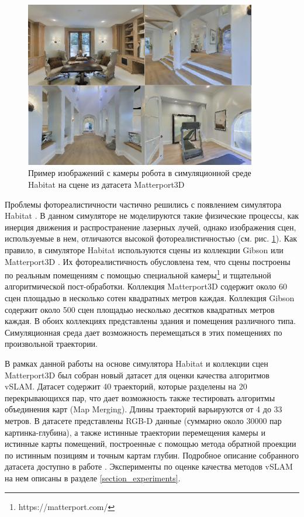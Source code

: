 \documentclass{mipt-thesis-ms}
\begin{document}
	\begin{figure}
		\includegraphics[width=0.9\textwidth]{img/habitat.png}
		\caption{Пример изображений с камеры робота в симуляционной среде Habitat на сцене из датасета Matterport3D}
		\label{figure_habitat}
	\end{figure}
	
	Проблемы фотореалистичности частично решились с появлением симулятора Habitat \cite{savva2019habitat}. В данном симуляторе не моделируются такие физические процессы, как инерция движения и распространение лазерных лучей, однако изображения сцен, используемые в нем, отличаются высокой фотореалистичностью (см. рис. \ref{figure_habitat}). Как правило, в симуляторе Habitat используются сцены из коллекции Gibson \cite{xia2018gibson} или Matterport3D \cite{chang2017matterport3d}. Их фотореалистичность обусловлена тем, что сцены построены по реальным помещениям с помощью специальной камеры\footnote{https://matterport.com/} и тщательной алгоритмической пост-обработки. Коллекция Matterport3D содержит около 60 сцен площадью в несколько сотен квадратных метров каждая. Коллекция Gibson содержит около 500 сцен площадью несколько десятков квадратных метров каждая. В обоих коллекциях представлены здания и помещения различного типа. Симуляционная среда дает возможность перемещаться в этих помещениях по произвольной траектории.
	
	В рамках данной работы на основе симулятора Habitat и коллекции сцен Matterport3D был собран новый датасет для оценки качества алгоритмов vSLAM. Датасет содержит 40 траекторий, которые разделены на 20 перекрывающихся пар, что дает возможность также тестировать алгоритмы объединения карт (Map Merging). Длины траекторий варьируются от 4 до 33 метров. В датасете представлены RGB-D данные (суммарно около 30000 пар картинка-глубина), а также истинные траектории перемещения камеры и истинные карты помещений, построенные с помощью метода обратной проекции по истинным позициям и точным картам глубин. Подробное описание собранного датасета доступно в работе \cite{bokovoy2021maomaps}. Эксперименты по оценке качества методов vSLAM на нем описаны в разделе \ref{section_experiments}.
	
\end{document}
